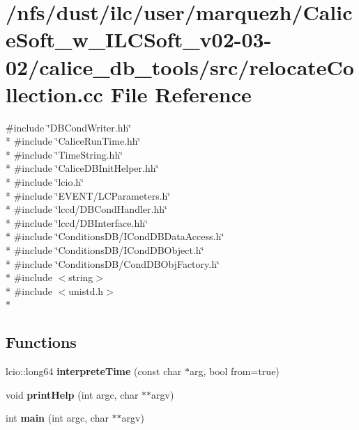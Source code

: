 \section{/nfs/dust/ilc/user/marquezh/\-Calice\-Soft\-\_\-w\-\_\-\-I\-L\-C\-Soft\-\_\-v02-\/03-\/02/calice\-\_\-db\-\_\-tools/src/relocate\-Collection.cc File Reference}
\label{relocateCollection_8cc}
{\ttfamily \#include \char`\"{}D\-B\-Cond\-Writer.\-hh\char`\"{}}\\*
{\ttfamily \#include \char`\"{}Calice\-Run\-Time.\-hh\char`\"{}}\\*
{\ttfamily \#include \char`\"{}Time\-String.\-hh\char`\"{}}\\*
{\ttfamily \#include \char`\"{}Calice\-D\-B\-Init\-Helper.\-hh\char`\"{}}\\*
{\ttfamily \#include \char`\"{}lcio.\-h\char`\"{}}\\*
{\ttfamily \#include \char`\"{}E\-V\-E\-N\-T/\-L\-C\-Parameters.\-h\char`\"{}}\\*
{\ttfamily \#include \char`\"{}lccd/\-D\-B\-Cond\-Handler.\-hh\char`\"{}}\\*
{\ttfamily \#include \char`\"{}lccd/\-D\-B\-Interface.\-hh\char`\"{}}\\*
{\ttfamily \#include \char`\"{}Conditions\-D\-B/\-I\-Cond\-D\-B\-Data\-Access.\-h\char`\"{}}\\*
{\ttfamily \#include \char`\"{}Conditions\-D\-B/\-I\-Cond\-D\-B\-Object.\-h\char`\"{}}\\*
{\ttfamily \#include \char`\"{}Conditions\-D\-B/\-Cond\-D\-B\-Obj\-Factory.\-h\char`\"{}}\\*
{\ttfamily \#include $<$string$>$}\\*
{\ttfamily \#include $<$unistd.\-h$>$}\\*
\subsection*{Functions}
\begin{DoxyCompactItemize}
\item 
lcio\-::long64 {\bfseries interprete\-Time} (const char $\ast$arg, bool from=true)\label{relocateCollection_8cc_ad4bc1ee6b3bcb259bd28bb7963f34db0}

\item 
void {\bfseries print\-Help} (int argc, char $\ast$$\ast$argv)\label{relocateCollection_8cc_a1b5a1d3071ab7a7222af534a20a6aba6}

\item 
int {\bfseries main} (int argc, char $\ast$$\ast$argv)\label{relocateCollection_8cc_a3c04138a5bfe5d72780bb7e82a18e627}

\end{DoxyCompactItemize}


